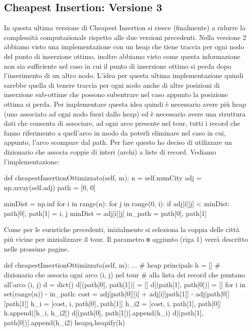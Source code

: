 \documentclass[a4paper,12pt]{report}
\begin{document}
\subsection{Cheapest Insertion: Versione 3}
In questa ultima versione di Cheapest Insertion si riesce (finalmente) a ridurre la complessità computazionale rispetto alle due versioni precedenti. Nella versione 2 abbiamo visto una implementazione con un heap che tiene traccia per ogni nodo del punto di inserzione ottimo, inoltre abbiamo visto come questa informazione non sia sufficiente nel caso in cui il punto di inserzione ottimo si perda dopo l'inserimento di un altro nodo. L'idea per questa ultima implementazione quindi sarebbe quella di tenere traccia per ogni nodo anche di altre posizioni di inserzione sub-ottime che possono subentrare nel caso appunto la posizione ottima si perda. Per implementare questa idea quindi è necessario avere più heap (uno associato ad ogni nodo fuori dallo heap) ed è necessario avere una struttura dati che consenta di associare, ad ogni arco presente nel tour, tutti i record che fanno riferimento a quell'arco in modo da poterli eliminare nel caso in cui, appunto, l'arco scompare dal path. Per fare questo ho deciso di utilizzare un dizionario che associa coppie di interi (archi) a liste di record. Vediamo l'implementazione:
\begin{python}
def cheapestInsertionOttimizzato(self, m):
  n = self.numCity
  adj = np.array(self.adj)
  path = [0, 0]

  minDist = np.inf
  for i in range(n):
    for j in range(0, i):
      if adj[i][j] < minDist:
        path[0], path[1] = i, j
        minDist = adj[i][j]
  in_path = {path[0], path[1]}
\end{python}
Come per le euristiche precedenti, inizialmente si seleziona la coppia delle città più vicine per inizializzare il tour. Il parametro \lstinline!m! aggiunto (riga 1) verrà descritto nelle prossime pagine.
\begin{python}
def cheapestInsertionOttimizzato(self, m):
  ...
  # heap principale
  h = []
  # dizionario che associa ogni arco (i, j) nel tour
  # alla lista dei record che puntano all'arco (i, j)
  d = dict()
  d[(path[0], path[1])] = []
  d[(path[1], path[0])] = []
  for i in set(range(n)) - in_path:
    cost = adj[path[0]][i] + adj[i][path[1]] - adj[path[0]][path[1]]
    h_i = [cost, i, path[0], path[1]]
    h_i2 = [cost, i, path[1], path[0]]
    h.append([h_i, h_i2])
    d[(path[0], path[1])].append(h_i)
    d[(path[1], path[0])].append(h_i2)
  heapq.heapify(h)
\end{python}
\end{document}
